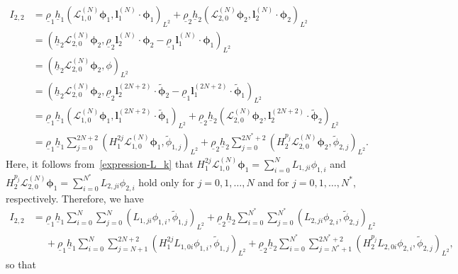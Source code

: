 \documentclass[11pt,leqno]{article}
\numberwithin{equation}{section}
\numberwithin{figure}{section}
\begin{document}
\begin{align*}
I_{2,2}
&= \underline{\rho}_1\underline{h}_1(\mathcal{L}_{1,0}^{(N)}\bm{\phi}_1,\bm{l}_1^{(N)}\cdot\bm{\phi}_1)_{L^2}
 + \underline{\rho}_2\underline{h}_2(\mathcal{L}_{2,0}^{(N)}\bm{\phi}_2,\bm{l}_2^{(N)}\cdot\bm{\phi}_2)_{L^2} \\
&= (\underline{h}_2\mathcal{L}_{2,0}^{(N)}\bm{\phi}_2,
 \underline{\rho}_2\bm{l}_2^{(N)}\cdot\bm{\phi}_2 - \underline{\rho}_1\bm{l}_1^{(N)}\cdot\bm{\phi}_1)_{L^2} \\
&= (\underline{h}_2\mathcal{L}_{2,0}^{(N)}\bm{\phi}_2,\phi)_{L^2} \\
&= (\underline{h}_2\mathcal{L}_{2,0}^{(N)}\bm{\phi}_2,
 \underline{\rho}_2\bm{l}_2^{(2N+2)}\cdot\tilde{\bm{\phi}}_2 - \underline{\rho}_1\bm{l}_1^{(2N+2)}\cdot\tilde{\bm{\phi}}_1)_{L^2} \\
&= \underline{\rho}_1\underline{h}_1(\mathcal{L}_{1,0}^{(N)}\bm{\phi}_1,\bm{l}_1^{(2N+2)}\cdot\tilde{\bm{\phi}}_1)_{L^2}
 + \underline{\rho}_2\underline{h}_2(\mathcal{L}_{2,0}^{(N)}\bm{\phi}_2,\bm{l}_2^{(2N+2)}\cdot\tilde{\bm{\phi}}_2)_{L^2} \\
&= \underline{\rho}_1\underline{h}_1\sum_{j=0}^{2N+2} (H_1^{2j}\mathcal{L}_{1,0}^{(N)}\bm{\phi}_1,\tilde{\phi}_{1,j})_{L^2}
 + \underline{\rho}_2\underline{h}_2\sum_{j=0}^{2N^*+2} (H_2^{p_j}\mathcal{L}_{2,0}^{(N)}\bm{\phi}_2,\tilde{\phi}_{2,j})_{L^2}. 
\end{align*}
%
Here, it follows from~\eqref{expression-L_k} that $H_1^{2j}\mathcal{L}_{1,0}^{(N)}\bm{\phi}_1 = \sum_{i=0}^NL_{1,ji}\phi_{1,i}$ 
and $H_2^{p_j}\mathcal{L}_{2,0}^{(N)}\bm{\phi}_1 = \sum_{i=0}^{N^*}L_{2,ji}\phi_{2,i}$ hold only for $j=0,1,\ldots,N$ and for 
$j=0,1,\ldots,N^*$, respectively. 
Therefore, we have 
%
\begin{align*}
I_{2,2}
&= \underline{\rho}_1\underline{h}_1 \sum_{i=0}^N\sum_{j=0}^{N} (L_{1,ji}\phi_{1,i},\tilde{\phi}_{1,j})_{L^2}
 + \underline{\rho}_2\underline{h}_2 \sum_{i=0}^{N^*}\sum_{j=0}^{N^*} (L_{2,ji}\phi_{2,i},\tilde{\phi}_{2,j})_{L^2} \\
&\quad\;
 + \underline{\rho}_1\underline{h}_1 \sum_{i=0}^N\sum_{j=N+1}^{2N+2} (H_1^{2j}L_{1,0i}\phi_{1,i},\tilde{\phi}_{1,j})_{L^2}
 + \underline{\rho}_2\underline{h}_2 \sum_{i=0}^{N^*}\sum_{j=N^*+1}^{2N^*+2} (H_2^{p_j}L_{2,0i}\phi_{2,i},\tilde{\phi}_{2,j})_{L^2},
\end{align*}
%
so that 
%
\end{document}
